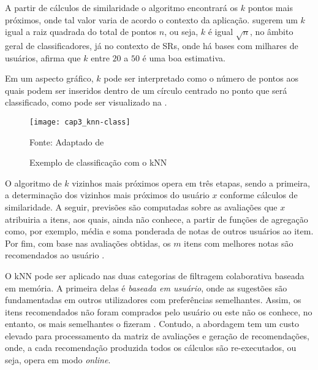             A partir de cálculos de similaridade o algoritmo encontrará os $k$ pontos mais próximos, onde tal valor varia de acordo o contexto da aplicação.  sugerem um $k$  igual a raiz quadrada do total de pontos $n$, ou seja, $k$ é igual $\sqrt{n}$, no âmbito geral de classificadores, já no contexto de SRs, onde há bases com milhares de usuários,  afirma que $k$ entre $20$ a $50$ é uma boa estimativa. 
            
            Em um aspecto gráfico, $k$ pode ser interpretado como o número de pontos aos quais podem ser inseridos dentro de um círculo centrado no ponto que será classificado, como pode ser visualizado na . 
            
            \begin{figure}[htb]
                \caption{Exemplo de classificação com o kNN}
                \texttt{[image: cap3\_knn-class]}
                \label{fig:cap3_knn-class}
                
                {\footnotesize Fonte: Adaptado de }
            \end{figure}            
            
                 
            O algoritmo de $k$ vizinhos mais próximos opera em três etapas, sendo a primeira, a determinação dos vizinhos mais próximos do usuário $x$ conforme cálculos de similaridade. A seguir, previsões são computadas sobre as avaliações que $x$ atribuiria a itens, aos quais, ainda não conhece, a partir de funções de agregação como, por exemplo, média e soma ponderada de notas de outros usuários ao item. Por fim, com base nas avaliações obtidas, os $m$ itens com melhores notas são recomendados ao usuário \cite{Bobadilla_2013}.
            
            
            O kNN pode ser aplicado nas duas categorias de filtragem colaborativa baseada em memória. A primeira delas é \textit{baseada em usuário}, onde as sugestões são fundamentadas em outros utilizadores com preferências semelhantes. Assim, os itens recomendados não foram comprados pelo usuário ou este não os conhece, no entanto, os mais semelhantes o fizeram \cite{Ricci2010}. Contudo, a abordagem tem um custo elevado para processamento da matriz de avaliações e geração de recomendações, onde, a cada recomendação produzida todos os cálculos são re-executados, ou seja, opera em modo \textit{online}.
            
